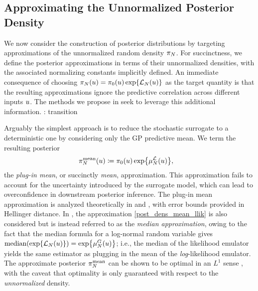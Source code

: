 \documentclass[12pt]{article}
\begin{document}
\subsection{Approximating the Unnormalized Posterior Density} \label{post_approx_unn_dens}
We now consider the construction of posterior distributions by targeting approximations of the 
unnormalized random density $\llikEmRdm[\Ndesign]{\postDens}$. For succinctness, we define 
the posterior approximations in terms of their unnormalized densities, with the associated 
normalizing constants implicitly defined. An immediate consequence of choosing 
$\llikEmRdm[\Ndesign]{\postDens}(\Par) = \priorDens(\Par) \Exp{\llikEm(\Par)}$ as the target
quantity is that the resulting approximations ignore the predictive correlation across different inputs
$\Par$. The methods we propose in  seek to leverage this additional 
information. \todo: transition

Arguably the simplest approach is to reduce the stochastic surrogate to a deterministic 
one by considering only the GP predictive mean. We term the resulting posterior
\begin{align}
\llikEmMeanDens[\Ndesign](\Par) &\Def \priorDens(\Par) \Exp{\emMean[\Ndesign]{\llik}(\Par)} 
\label{post_dens_mean_llik},
\end{align}
the \textit{plug-in mean}, or succinctly \textit{mean}, approximation. 
This approximation fails to account for the uncertainty introduced by the surrogate model, which can lead 
to overconfidence in downstream posterior inference. The plug-in mean approximation 
is analyzed theoretically in \cite{StuartTeck1} and \cite{gp_surrogates_random_exploration}, 
with error bounds provided in Hellinger distance. In \cite{VehtariParallelGP}, 
the approximation \ref{post_dens_mean_llik} is also considered but is instead referred to as the 
\textit{median approximation}, owing to the fact that the median formula for a log-normal random variable 
gives $\text{median}(\Exp{\llikEm[\Ndesign](\Par)}) = \Exp{\emMean[\Ndesign]{\fwd}(\Par)}$; 
i.e., the median of the likelihood emulator yields the same estimator as plugging in the mean of the 
\textit{log}-likelihood emulator. The approximate posterior $\llikEmMeanDens[\Ndesign]$ can be 
shown to be optimal in an $L^1$ sense \citep{VehtariParallelGP, StuartTeck2}, with the caveat that 
optimality is only guaranteed with respect to the \textit{unnormalized} density.
\end{document}
